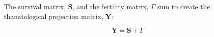 \documentclass[12pt,oneside,a4paper,leqno]{article}
\begin{document}
The survival matrix, \textbf{S}, and the fertility matrix, \textbf{$\Gamma$} sum
to create the thanatological projection matrix, \textbf{Y}:

\begin{equation}
\textbf{Y} = \textbf{S} + \textbf{$\Gamma$}
\end{equation}

\end{document}
